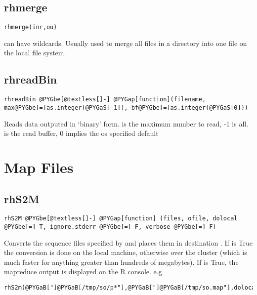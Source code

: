 \documentclass[letterpaper,10pt,english]{manual}
\begin{document}
\subsection{rhmerge}

\begin{Verbatim}[commandchars=@\[\]]
rhmerge(inr,ou)
\end{Verbatim}

 can have wildcards. Usually used to merge all files in a directory into one file  on the local file system.


\subsection{rhreadBin}

\begin{Verbatim}[commandchars=@\[\]]
rhreadBin @PYGbe[@textless[]-] @PYGap[function](filename, max@PYGbe[=]as.integer(@PYGaS[-1]), bf@PYGbe[=]as.integer(@PYGaS[0]))
\end{Verbatim}

Reads data outputed in `binary' form.  is the maximum number to read, -1
is all.  is the read buffer, 0 implies the os specified default 


\section{Map Files}


\subsection{rhS2M}

\begin{Verbatim}[commandchars=@\[\]]
rhS2M @PYGbe[@textless[]-] @PYGap[function] (files, ofile, dolocal @PYGbe[=] T, ignore.stderr @PYGbe[=] F, verbose @PYGbe[=] F)
\end{Verbatim}

Converts the sequence files specified by  and places them in
destination . If  is True the conversion is done on the
local machine, otherwise over the cluster (which is much faster for anything
greater than hundreds of megabytes). If  is True, the mapreduce
output is displayed on the R console. e.g

\begin{Verbatim}[commandchars=@\[\]]
rhS2m(@PYGaB["]@PYGaB[/tmp/so/p*"],@PYGaB["]@PYGaB[/tmp/so.map"],dolocal@PYGbe[=]F)
\end{Verbatim}
\end{document}
